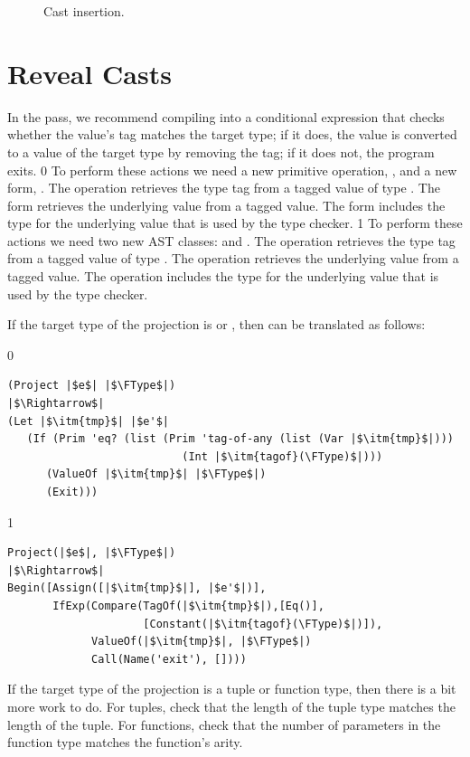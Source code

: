 \documentclass[7x10]{TimesAPriori_MIT}%
\def\racketEd{0}
\def\pythonEd{1}
\providecommand{\BookEdition}{1}
\let\edition\BookEdition
\newcommand{\pythonColor}[0]{}
\numberwithin{theorem}{chapter}
\numberwithin{definition}{chapter}
\numberwithin{equation}{chapter}
\begin{document}
\begin{figure}[btp]
  \caption{Cast insertion.}
\label{fig:compile-r7-Lany}
\end{figure}



\section{Reveal Casts}
\label{sec:reveal-casts-Lany}


In the  pass, we recommend compiling
 into a conditional expression that checks whether the
value's tag matches the target type; if it does, the value is
converted to a value of the target type by removing the tag; if it
does not, the program exits.
%
{\if\edition\racketEd
%
To perform these actions we need a new primitive operation,
, and a new form, .
The  operation retrieves the type tag from a tagged
value of type .  The  form retrieves the
underlying value from a tagged value.  The  form
includes the type for the underlying value that is used by the type
checker.
%
\fi}
%
{\if\edition\pythonEd\pythonColor
%
To perform these actions we need two new AST classes:  and
. The  operation retrieves the type tag from a
tagged value of type \ANYTY{}.  The  operation retrieves
the underlying value from a tagged value.  The 
operation includes the type for the underlying value that is used by
the type checker.
%
\fi}

If the target type of the projection is \BOOLTY{} or \INTTY{}, then
 can be translated as follows:
\begin{center}
\begin{minipage}{1.0\textwidth}
{\if\edition\racketEd    
\begin{lstlisting}
(Project |$e$| |$\FType$|)
|$\Rightarrow$|
(Let |$\itm{tmp}$| |$e'$|
   (If (Prim 'eq? (list (Prim 'tag-of-any (list (Var |$\itm{tmp}$|)))
                           (Int |$\itm{tagof}(\FType)$|)))
      (ValueOf |$\itm{tmp}$| |$\FType$|)
      (Exit)))
\end{lstlisting}
\fi}
{\if\edition\pythonEd\pythonColor
\begin{lstlisting}
Project(|$e$|, |$\FType$|)
|$\Rightarrow$|
Begin([Assign([|$\itm{tmp}$|], |$e'$|)],
       IfExp(Compare(TagOf(|$\itm{tmp}$|),[Eq()],
                     [Constant(|$\itm{tagof}(\FType)$|)]),
             ValueOf(|$\itm{tmp}$|, |$\FType$|)
             Call(Name('exit'), [])))
\end{lstlisting}
\fi}
\end{minipage}
\end{center}
If the target type of the projection is a tuple or function type, then
there is a bit more work to do. For tuples, check that the length of
the tuple type matches the length of the tuple. For functions, check
that the number of parameters in the function type matches the
function's arity.
\end{document}
